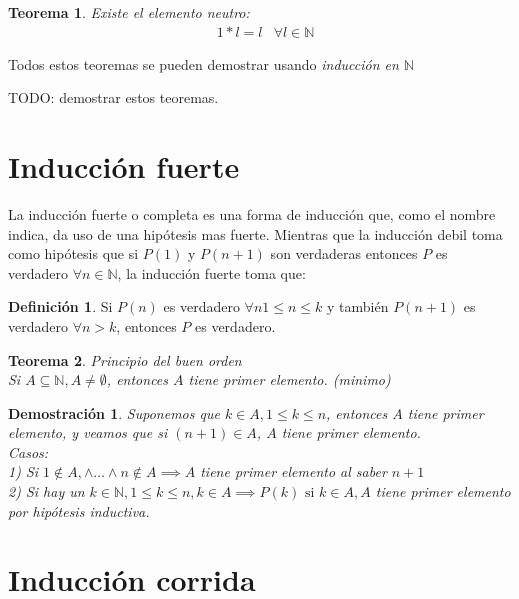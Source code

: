 \documentclass[9pt,a4paper,draft]{article}
\theoremstyle{definition}
\newtheorem{defi}{Definición}
\theoremstyle{plain}
\newtheorem{teo}{Teorema}
\newtheorem{demo}{Demostración}[teo]
\begin{document}
\begin{teo} \label{teoelneu}Existe el elemento neutro:\\
\begin{align*} & 1*l=l & \forall l\in{\mathbb{N}} \end{align*}
\end{teo}

Todos estos teoremas se pueden demostrar usando {\itshape inducción en $\mathbb{N}$} 

TODO: demostrar estos teoremas.

\section{Inducción fuerte}

La inducción fuerte o completa es una forma de inducción que, como el nombre indica, da uso de una hipótesis mas fuerte. Mientras que la inducción debil toma como hipótesis que si $P(1)$ y $P(n+1)$ son verdaderas entonces $P$ es verdadero $\forall{n}\in{\mathbb{N}}$, la inducción fuerte toma que:\\

\begin{defi} Si $P(n)$ es verdadero $\forall{n} {1}\leq{n}\leq{k}$ y también $P(n+1)$ es verdadero $\forall n>k$, entonces $P$ es verdadero.\end{defi}

\begin{teo} Principio del buen orden\\

Si $A \subseteq \mathbb{N}, A \neq \emptyset$, entonces $A$ tiene primer elemento. (minimo)
\end{teo}

\begin{demo} Suponemos que $k\in{A}, {1}\leq{k}\leq{n}$, entonces $A$ tiene primer elemento, y veamos que si $(n+1)\in{A}$, $A$ tiene primer elemento.\\

Casos:\\
1) Si $1\notin{A}, \land \dots \land n\notin{A} \implies A$ tiene primer elemento al saber $n+1$\\
2) Si hay un $k\in{\mathbb{N}}, 1\leq{k}\leq{n}, k\in{A} \implies P(k)\text{ si } k\in{A}, A$ tiene primer elemento por hipótesis inductiva.
\end{demo}

\section{Inducción corrida}
\end{document}
